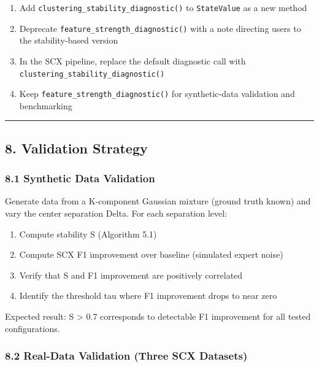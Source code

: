 \documentclass[
  12pt,
]{article}
\providecommand{\tightlist}{%
  \setlength{\itemsep}{0pt}\setlength{\parskip}{0pt}}
\begin{document}
\begin{enumerate}
\def\labelenumi{\arabic{enumi}.}
\tightlist
\item
  Add \texttt{clustering\_stability\_diagnostic()} to
  \texttt{StateValue} as a new method
\item
  Deprecate \texttt{feature\_strength\_diagnostic()} with a note
  directing users to the stability-based version
\item
  In the SCX pipeline, replace the default diagnostic call with
  \texttt{clustering\_stability\_diagnostic()}
\item
  Keep \texttt{feature\_strength\_diagnostic()} for synthetic-data
  validation and benchmarking
\end{enumerate}

\begin{center}\rule{0.5\linewidth}{0.5pt}\end{center}

\subsection{8. Validation Strategy}\label{validation-strategy}

\subsubsection{8.1 Synthetic Data
Validation}\label{synthetic-data-validation}

Generate data from a K-component Gaussian mixture (ground truth known)
and vary the center separation Delta. For each separation level:

\begin{enumerate}
\def\labelenumi{\arabic{enumi}.}
\tightlist
\item
  Compute stability S (Algorithm 5.1)
\item
  Compute SCX F1 improvement over baseline (simulated expert noise)
\item
  Verify that S and F1 improvement are positively correlated
\item
  Identify the threshold tau where F1 improvement drops to near zero
\end{enumerate}

Expected result: S \textgreater{} 0.7 corresponds to detectable F1
improvement for all tested configurations.

\subsubsection{8.2 Real-Data Validation (Three SCX
Datasets)}\label{real-data-validation-three-scx-datasets}
\end{document}
